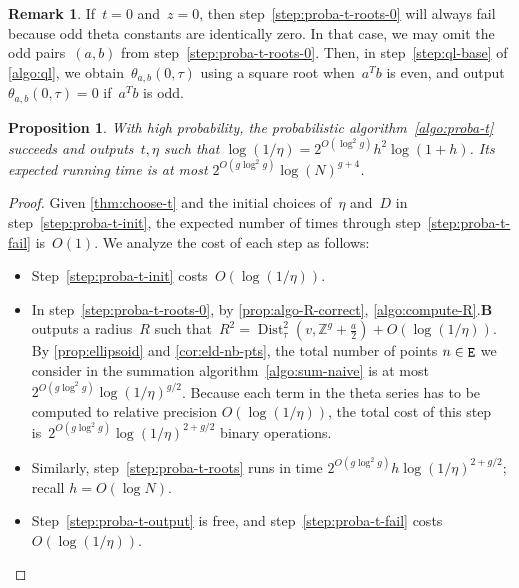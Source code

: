\documentclass[12pt,oneside]{amsart}
\numberwithin{equation}{section}
\newtheorem{prop}[equation]{Proposition}
\theoremstyle{definition}
\newtheorem{rem}[equation]{Remark}
\newcommand{\Z}{\mathbb{Z}}
\DeclareMathOperator{\Dist}{Dist}
\DeclareMathOperator{\E}{\tt E}
\begin{document}
\begin{rem}
  \label{rem:zero-odd}
  If~$t=0$ and~$z=0$, then step~\eqref{step:proba-t-roots-0} will always fail
  because odd theta constants are identically zero. In that case, we may omit
  the odd pairs~$(a,b)$ from step~\eqref{step:proba-t-roots-0}. Then, in
  step~\eqref{step:ql-base} of \cref{algo:ql}, we obtain~$\theta_{a,b}(0,\tau)$
  using a square root when~$a^T b$ is even, and output~$\theta_{a,b}(0,\tau)=0$
  if~$a^Tb$ is odd.
\end{rem}


\begin{prop}
  \label{prop:setup-proba-cost}
  With high probability, the probabilistic algorithm~\ref{algo:proba-t}
  succeeds and outputs~$t,\eta$ such that
  $\log(1/\eta) = 2^{O(\log^2 g)}h^2\log(1+h)$. Its expected running time is at
  most $2^{O(g\log^2 g)} \log(N)^{g+4}$.
\end{prop}

\begin{proof}
  Given \cref{thm:choose-t} and the initial choices of~$\eta$ and~$D$ in
  step~\eqref{step:proba-t-init}, the expected number of times through
  step~\eqref{step:proba-t-fail} is~$O(1)$. We
  analyze the cost of each step as follows:
  \begin{itemize}
  \item Step~\eqref{step:proba-t-init} costs~$O(\log(1/\eta))$.
  \item In step~\eqref{step:proba-t-roots-0}, by \cref{prop:algo-R-correct},
    \cref{algo:compute-R}.\textbf{B} outputs a radius~$R$ such
    that~$R^2 = \Dist_\tau^2(v,\Z^g + \tfrac a2) + O(\log(1/\eta))$. By
    \cref{prop:ellipsoid} and \cref{cor:eld-nb-pts}, the total number of points
    $n\in \E$ we consider in the summation algorithm~\ref{algo:sum-naive} is at
    most~$2^{O(g\log^2 g)} \log(1/\eta)^{g/2}$. Because each term in the theta
    series has to be computed to relative precision $O(\log(1/\eta))$, the
    total cost of this step is~$2^{O(g\log^2 g)} \log(1/\eta)^{2+ g/2}$ binary
    operations.
  \item Similarly, step~\eqref{step:proba-t-roots} runs in time
    $2^{O(g\log^2 g)} h \log(1/\eta)^{2 + g/2}$; recall $h = O(\log N)$.
  \item Step~\eqref{step:proba-t-output} is free, and
    step~\eqref{step:proba-t-fail} costs~$O(\log(1/\eta))$. \qedhere
  \end{itemize}
\end{proof}
\end{document}
